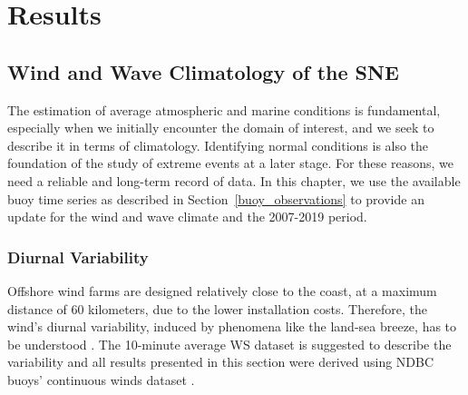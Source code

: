 
\chapter{Results}\label{results} %

\section{Wind and Wave Climatology of the SNE}


The estimation of average atmospheric and marine conditions is fundamental, especially when we initially encounter the domain of interest, and we seek to describe it in terms of climatology. Identifying normal conditions is also the foundation of the study of extreme events at a later stage. For these reasons, we need a reliable and long-term record of data. In this chapter, we use the available buoy time series as described in Section~\ref{buoy_observations} to provide an update for the wind and wave climate and the 2007-2019 period.


\subsection{Diurnal Variability}\label{diurnal_variability}

Offshore wind farms are designed relatively close to the coast, at a maximum distance of 60 kilometers, due to the lower installation costs. Therefore, the wind's diurnal variability, induced by phenomena like the land-sea breeze, has to be understood \cite{Barthelmie2003}. The 10-minute average WS dataset is suggested to describe the variability \cite{DNVGL2018} and all results presented in this section were derived using NDBC buoys' continuous winds dataset \cite{Data2009}.

